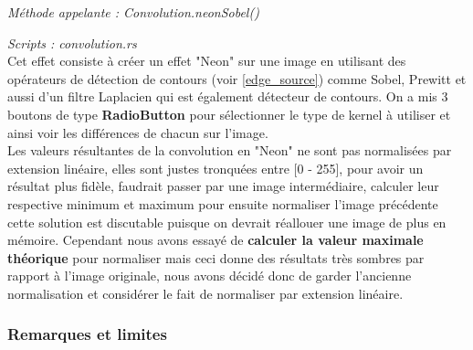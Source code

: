         \emph{Méthode appelante : Convolution.neonSobel()}

        \emph{Scripts : convolution.rs} 
        \\

        Cet effet consiste à créer un effet "Neon" sur une image en utilisant des opérateurs de détection de contours (voir \ref{edge_source}) comme Sobel, Prewitt et aussi d'un filtre Laplacien qui est également détecteur de contours.
        On a mis 3 boutons de type \textbf{RadioButton} pour sélectionner le type de kernel à utiliser et ainsi voir les différences de chacun sur l'image.
        \\
        
        Les valeurs résultantes de la convolution en "Neon" ne sont pas normalisées par extension linéaire, elles sont justes tronquées entre [0 - 255], pour avoir un résultat plus fidèle, faudrait passer par une image intermédiaire, calculer 
        leur respective minimum et maximum pour ensuite normaliser l'image précédente cette solution est discutable puisque on devrait réallouer une image de plus en mémoire. Cependant
        nous avons essayé de \textbf{calculer la valeur maximale théorique} pour normaliser mais ceci donne des résultats très sombres par rapport à l'image originale, nous avons décidé donc de garder l'ancienne normalisation et considérer le fait de normaliser par extension linéaire.
        \\

    \subsubsection{Remarques et limites} \label{limits_conv}

